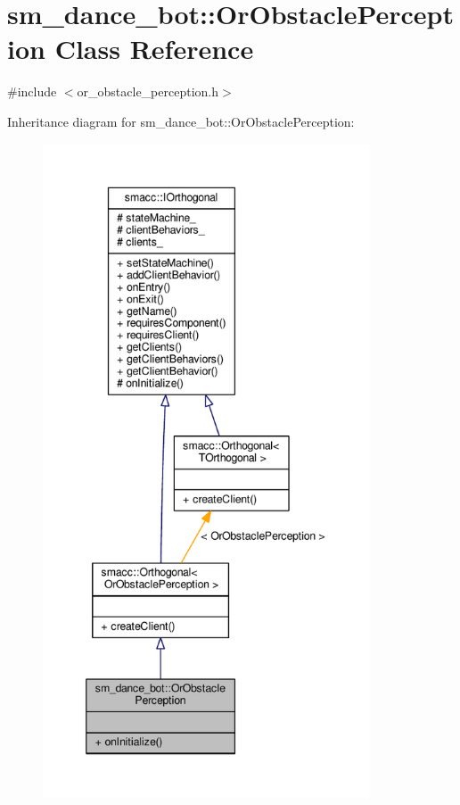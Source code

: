 \hypertarget{classsm__dance__bot_1_1OrObstaclePerception}{}\section{sm\+\_\+dance\+\_\+bot\+:\+:Or\+Obstacle\+Perception Class Reference}
\label{classsm__dance__bot_1_1OrObstaclePerception}


{\ttfamily \#include $<$or\+\_\+obstacle\+\_\+perception.\+h$>$}



Inheritance diagram for sm\+\_\+dance\+\_\+bot\+:\+:Or\+Obstacle\+Perception\+:\nopagebreak
\begin{figure}[H]
\begin{center}
\leavevmode
\includegraphics[height=550pt]{classsm__dance__bot_1_1OrObstaclePerception__inherit__graph}
\end{center}
\end{figure}


